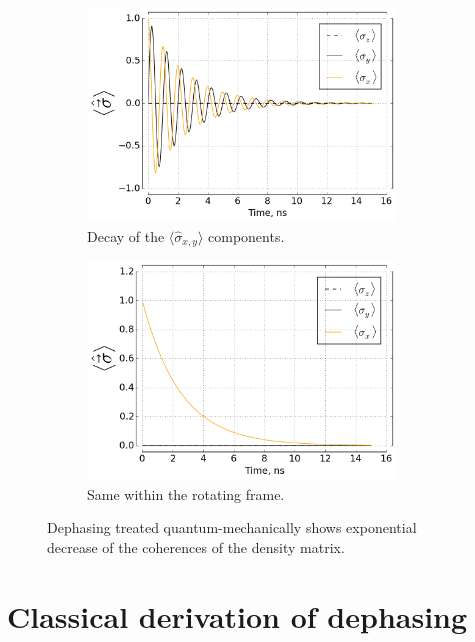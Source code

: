 \documentclass[12pt]{report}
\numberwithin{equation}{section}
\begin{document}
\begin{figure}
\begin{subfigure}[t]{0.45\textwidth}
\centering
\includegraphics[width=0.9\textwidth]{qdeph_xyz}
\caption{Decay of the $\langle \hat \sigma_{x, y} \rangle$ components.}
\end{subfigure}
\begin{subfigure}[t]{0.45\textwidth}
\centering
\includegraphics[width=0.9\textwidth]{qdeph_xyz_rf}
\caption{Same within the rotating frame.}
\end{subfigure}
\caption{Dephasing treated quantum-mechanically shows exponential decrease of the coherences of the density matrix.}
\label{fig:qdeph}
\end{figure}

\section{Classical derivation of dephasing}
\end{document}
